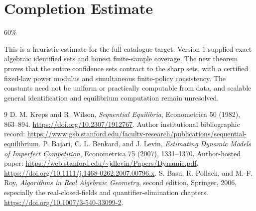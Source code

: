 \documentclass[11pt]{article}
\theoremstyle{remark}\newtheorem{remark}[theorem]{Remark}
\begin{document}
\section{Completion Estimate}
60\%

This is a heuristic estimate for the full catalogue target.
Version 1 supplied exact algebraic identified sets and honest finite-sample
coverage. The new theorem proves that the entire confidence sets contract
to the sharp sets, with a certified fixed-law power modulus and simultaneous
finite-policy consistency. The constants need not be uniform or practically
computable from data, and scalable general identification and equilibrium
computation remain unresolved.

\begin{thebibliography}{9}
 D. M. Kreps and R. Wilson, \emph{Sequential Equilibria}, Econometrica 50 (1982), 863--894. \url{https://doi.org/10.2307/1912767}. Author institutional bibliographic record: \url{https://www.gsb.stanford.edu/faculty-research/publications/sequential-equilibrium}.
 P. Bajari, C. L. Benkard, and J. Levin, \emph{Estimating Dynamic Models of Imperfect Competition}, Econometrica 75 (2007), 1331--1370. Author-hosted paper: \url{https://web.stanford.edu/~jdlevin/Papers/Dynamic.pdf}. \url{https://doi.org/10.1111/j.1468-0262.2007.00796.x}.
 S. Basu, R. Pollack, and M.-F. Roy, \emph{Algorithms in Real Algebraic Geometry}, second edition, Springer, 2006, especially the real-closed-fields and quantifier-elimination chapters. \url{https://doi.org/10.1007/3-540-33099-2}.
\end{thebibliography}
\end{document}
